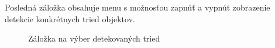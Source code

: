         Posledná záložka obsahuje menu s možnosťou zapnúť a vypnúť zobrazenie detekcie konkrétnych tried objektov. 

        \begin{figure}[H]
            \centering
            \caption{Záložka na výber detekovaných tried}
        \end{figure}